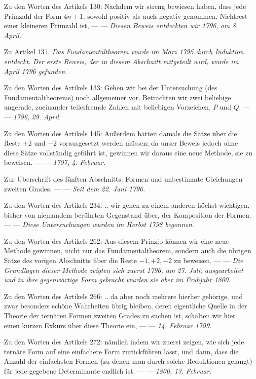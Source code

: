 Zu den Worten des Artikels 130: Nachdem wir streng bewiesen haben, dass jede Primzahl der Form \(4n+1\), sowohl positiv als auch negativ genommen, Nichtrest einer kleineren Primzahl ist, — — \textit{Diesen Beweis entdeckten wir 1796, am 8. April.}


Zu Artikel 131. \textit{Das Fundamentaltheorem wurde im März 1795 durch Induktion entdeckt. Der erste Beweis, der in diesem Abschnitt mitgeteilt wird, wurde im April 1796 gefunden.}



Zu den Worten des Artikels 133: Gehen wir bei der Untersuchung (des Fundamentaltheorems) noch allgemeiner vor. Betrachten wir zwei beliebige ungerade, zueinander teilerfremde Zahlen mit beliebigen Vorzeichen, \(P\) und \(Q\). — — \textit{1796, 29. April.}


Zu den Worten des Artikels 145: Außerdem hätten damals die Sätze über die Reste \(+2\) und \(-2\) vorausgesetzt werden müssen; da unser Beweis jedoch ohne diese Sätze vollständig geführt ist, gewinnen wir daraus eine neue Methode, sie zu beweisen. — — \textit{1797, 4. Februar.}


Zur Überschrift des fünften Abschnitts: Formen und unbestimmte Gleichungen zweiten Grades. — — \textit{Seit dem 22. Juni 1796.}


Zu den Worten des Artikels 234: .. wir gehen zu einem anderen höchst wichtigen, bisher von niemandem berührten Gegenstand über, der Komposition der Formen. — — \textit{Diese Untersuchungen wurden im Herbst 1798 begonnen.}


Zu den Worten des Artikels 262: Aus diesem Prinzip können wir eine neue Methode gewinnen, nicht nur das Fundamentaltheorem, sondern auch die übrigen Sätze des vorigen Abschnitts über die Reste \(-1,\allowbreak +2,\allowbreak -2\) zu beweisen, — — \textit{Die Grundlagen dieser Methode zeigten sich zuerst 1796, am 27. Juli; ausgearbeitet und in ihre gegenwärtige Form gebracht wurden sie aber im Frühjahr 1800.}


Zu den Worten des Artikels 266: .. da aber noch mehrere hierher gehörige, und zwar besonders schöne Wahrheiten übrig bleiben, deren eigentliche Quelle in der Theorie der ternären Formen zweiten Grades zu suchen ist, schalten wir hier einen kurzen Exkurs über diese Theorie ein, — — \textit{14. Februar 1799.}


Zu den Worten des Artikels 272: nämlich indem wir zuerst zeigen, wie sich jede ternäre Form auf eine einfachere Form zurückführen lässt, und dann, dass die Anzahl der einfachsten Formen (zu denen man durch solche Reduktionen gelangt) für jede gegebene Determinante endlich ist. — — \textit{1800, 13. Februar.}


